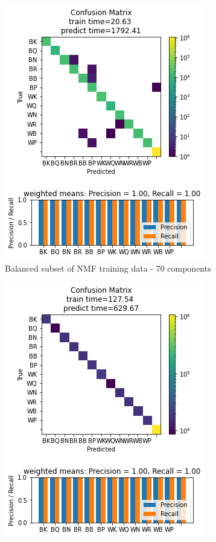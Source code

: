 \documentclass{article}
\newcommand{\NMFBL}{Balanced subset of NMF training data - 70 components}
\begin{document}
\begin{figure}[h]
\begin{subfigure}{0.33\textwidth}
\includegraphics[width=0.9\linewidth]{5NN_B_NMF70c_160x160_evaluation.png} 
\caption{\NMFBL}
\end{subfigure}
\begin{subfigure}{0.33\textwidth}
\includegraphics[width=0.9\linewidth]{5NN_PCA50c_160x160_evaluation.png}

\end{subfigure}
\end{figure}
\end{document}
